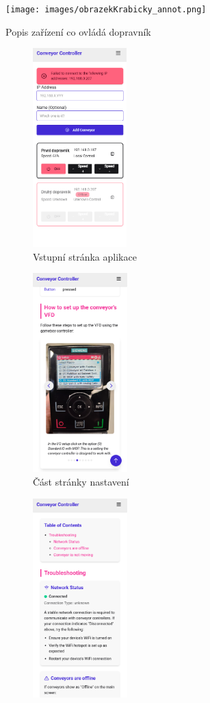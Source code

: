 \begin{figure}[H]
    \centering
    \texttt{[image: images/obrazekKrabicky\_annot.png]}
    \caption{Popis zařízení co ovládá dopravník}
    \label{fig:PopisZarizeniCoOvladaDopravnik}
\end{figure}

\begin{figure}[H]
    \centering
    \begin{subfigure}[t]{0.3\textwidth}
        \includegraphics[width=\textwidth, height=290px]{images/MobilniLanding.png}
        \caption{Vstupní stránka aplikace}
        \label{fig:MobilniLanding}
    \end{subfigure}%
    \begin{subfigure}[t]{0.3\textwidth}
        \includegraphics[width=\textwidth, height=290px]{images/MobilniSetup.png}
        \caption{Část stránky nastavení}
        \label{fig:MobilniSetup}
    \end{subfigure}%
    \begin{subfigure}[t]{0.3\textwidth}
        \includegraphics[width=\textwidth, height=290px]{images/MobilniHelp.png}

\end{subfigure}
\end{figure}
